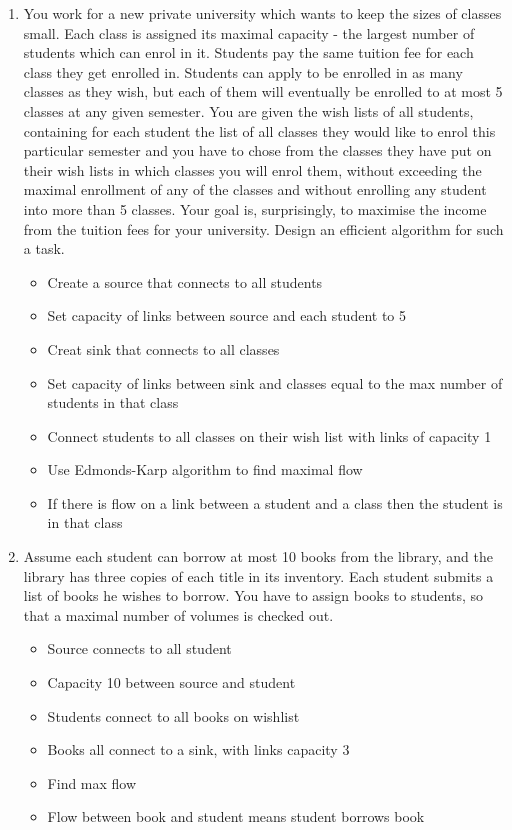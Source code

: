 \documentclass[a4paper]{article}
\begin{document}
\begin{enumerate}
				\clearpage
		\item You work for a new private university which wants to keep the sizes of classes small. Each class is assigned its maximal capacity - the largest number of students which can enrol in it. Students pay the same tuition fee for each class they get enrolled in. Students can apply to be enrolled in as many classes as they wish, but each of them will eventually be enrolled to at most 5 classes at any given semester. You are given the wish lists of all students, containing for each student the list of all classes they would like to enrol this particular semester and you have to chose from the classes they have put on their wish lists in which classes you will enrol them, without exceeding the maximal enrollment of any of the classes and without enrolling any student into more than 5 classes. Your goal is, surprisingly, to maximise the income from the tuition fees for your university. Design an efficient algorithm for such a task.
				\begin{itemize}
						\item Create a source that connects to all students
						\item Set capacity of links between source and each student to 5
						\item Creat sink that connects to all classes
						\item Set capacity of links between sink and classes equal to the max number of students in that class
						\item Connect students to all classes on their wish list with links of capacity 1
						\item Use Edmonds-Karp algorithm to find maximal flow
						\item If there is flow on a link between a student and a class then the student is in that class
				\end{itemize}

		\item  Assume each student can borrow at most 10 books from the library, and the library has three copies of each title in its inventory. Each student submits a list of books he wishes to borrow. You have to assign books to students, so that a maximal number of volumes is checked out.
				\begin{itemize}
						\item Source connects to all student
						\item Capacity 10 between source and student
						\item Students connect to all books on wishlist
						\item Books all connect to a sink, with links capacity 3
						\item Find max flow
						\item Flow between book and student means student borrows book
				\end{itemize}



\end{enumerate}
\end{document}
